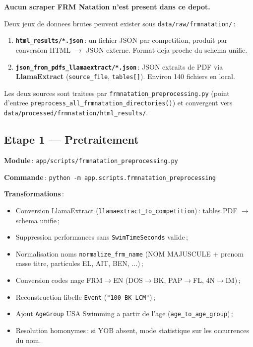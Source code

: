 \documentclass[11pt,a4paper]{article}
\begin{document}
\textbf{Aucun scraper FRM Natation n'est present dans ce depot.}

Deux jeux de donnees brutes peuvent exister sous \texttt{data/raw/frmnatation/}\,:

\begin{enumerate}
  \item \textbf{\texttt{html\_results/*.json}}\,: un fichier JSON par competition, produit par conversion HTML $\rightarrow$ JSON externe. Format deja proche du schema unifie.
  \item \textbf{\texttt{json\_from\_pdfs\_llamaextract/*.json}}\,: JSON extraits de PDF via \textbf{LlamaExtract} (\texttt{source\_file}, \texttt{tables[]}). Environ 140 fichiers en local.
\end{enumerate}

Les deux sources sont traitees par \texttt{frmnatation\_preprocessing.py} (point d'entree \texttt{preprocess\_all\_frmnatation\_directories()}) et convergent vers \texttt{data/processed/frmnatation/html\_results/}.

\subsection{Etape 1 --- Pretraitement}

\textbf{Module}\,: \texttt{app/scripts/frmnatation\_preprocessing.py}

\textbf{Commande}\,: \texttt{python -m app.scripts.frmnatation\_preprocessing}

\textbf{Transformations}\,:
\begin{itemize}
  \item Conversion LlamaExtract (\texttt{llamaextract\_to\_competition})\,: tables PDF $\rightarrow$ schema unifie\,;
  \item Suppression performances sans \texttt{SwimTimeSeconds} valide\,;
  \item Normalisation noms \texttt{normalize\_frm\_name} (NOM MAJUSCULE + prenom casse titre, particules EL, AIT, BEN, ...)\,;
  \item Conversion codes nage FRM$\rightarrow$EN (DOS$\rightarrow$BK, PAP$\rightarrow$FL, 4N$\rightarrow$IM)\,;
  \item Reconstruction libelle \texttt{Event} (\texttt{"100 BK LCM"})\,;
  \item Ajout \texttt{AgeGroup} USA Swimming a partir de l'age (\texttt{age\_to\_age\_group})\,;
  \item Resolution homonymes\,: si YOB absent, mode statistique sur les occurrences du nom.
\end{itemize}
\end{document}
